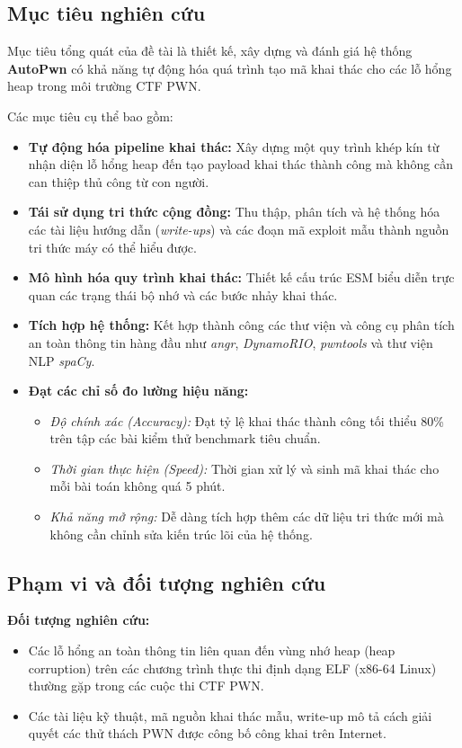 \documentclass[final]{hcmuitthesis}
\begin{document}
\subsection{Mục tiêu nghiên cứu}
Mục tiêu tổng quát của đề tài là thiết kế, xây dựng và đánh giá hệ thống \textbf{AutoPwn} có khả năng tự động hóa quá trình tạo mã khai thác cho các lỗ hổng heap trong môi trường CTF PWN. 

Các mục tiêu cụ thể bao gồm:
\begin{itemize}
    \item \textbf{Tự động hóa pipeline khai thác:} Xây dựng một quy trình khép kín từ nhận diện lỗ hổng heap đến tạo payload khai thác thành công mà không cần can thiệp thủ công từ con người.
    \item \textbf{Tái sử dụng tri thức cộng đồng:} Thu thập, phân tích và hệ thống hóa các tài liệu hướng dẫn (\textit{write-ups}) và các đoạn mã exploit mẫu thành nguồn tri thức máy có thể hiểu được.
    \item \textbf{Mô hình hóa quy trình khai thác:} Thiết kế cấu trúc ESM biểu diễn trực quan các trạng thái bộ nhớ và các bước nhảy khai thác.
    \item \textbf{Tích hợp hệ thống:} Kết hợp thành công các thư viện và công cụ phân tích an toàn thông tin hàng đầu như \textit{angr}, \textit{DynamoRIO}, \textit{pwntools} và thư viện NLP \textit{spaCy}.
    \item \textbf{Đạt các chỉ số đo lường hiệu năng:}
    \begin{itemize}
        \item \textit{Độ chính xác (Accuracy):} Đạt tỷ lệ khai thác thành công tối thiểu 80\% trên tập các bài kiểm thử benchmark tiêu chuẩn.
        \item \textit{Thời gian thực hiện (Speed):} Thời gian xử lý và sinh mã khai thác cho mỗi bài toán không quá 5 phút.
        \item \textit{Khả năng mở rộng:} Dễ dàng tích hợp thêm các dữ liệu tri thức mới mà không cần chỉnh sửa kiến trúc lõi của hệ thống.
    \end{itemize}
\end{itemize}

\subsection{Phạm vi và đối tượng nghiên cứu}
\textbf{Đối tượng nghiên cứu:}
\begin{itemize}
    \item Các lỗ hổng an toàn thông tin liên quan đến vùng nhớ heap (heap corruption) trên các chương trình thực thi định dạng ELF (x86-64 Linux) thường gặp trong các cuộc thi CTF PWN.
    \item Các tài liệu kỹ thuật, mã nguồn khai thác mẫu, write-up mô tả cách giải quyết các thử thách PWN được công bố công khai trên Internet.
\end{itemize}
\end{document}
